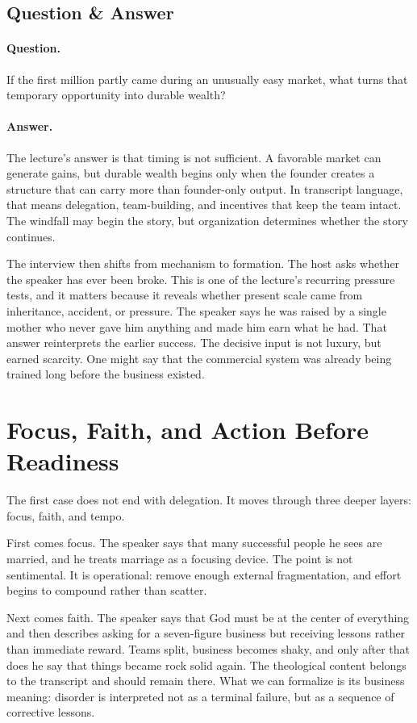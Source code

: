 \subsection{Question \& Answer}

\paragraph{Question.} If the first million partly came during an unusually easy market, what turns that temporary opportunity into durable wealth?

\paragraph{Answer.} The lecture's answer is that timing is not sufficient. A favorable market can generate gains, but durable wealth begins only when the founder creates a structure that can carry more than founder-only output. In transcript language, that means delegation, team-building, and incentives that keep the team intact. The windfall may begin the story, but organization determines whether the story continues.

The interview then shifts from mechanism to formation. The host asks whether the speaker has ever been broke. This is one of the lecture's recurring pressure tests, and it matters because it reveals whether present scale came from inheritance, accident, or pressure. The speaker says he was raised by a single mother who never gave him anything and made him earn what he had. That answer reinterprets the earlier success. The decisive input is not luxury, but earned scarcity. One might say that the commercial system was already being trained long before the business existed.

\section{Focus, Faith, and Action Before Readiness}

The first case does not end with delegation. It moves through three deeper layers: focus, faith, and tempo.

First comes focus. The speaker says that many successful people he sees are married, and he treats marriage as a focusing device. The point is not sentimental. It is operational: remove enough external fragmentation, and effort begins to compound rather than scatter.

Next comes faith. The speaker says that God must be at the center of everything and then describes asking for a seven-figure business but receiving lessons rather than immediate reward. Teams split, business becomes shaky, and only after that does he say that things became rock solid again. The theological content belongs to the transcript and should remain there. What we can formalize is its business meaning: disorder is interpreted not as a terminal failure, but as a sequence of corrective lessons.


